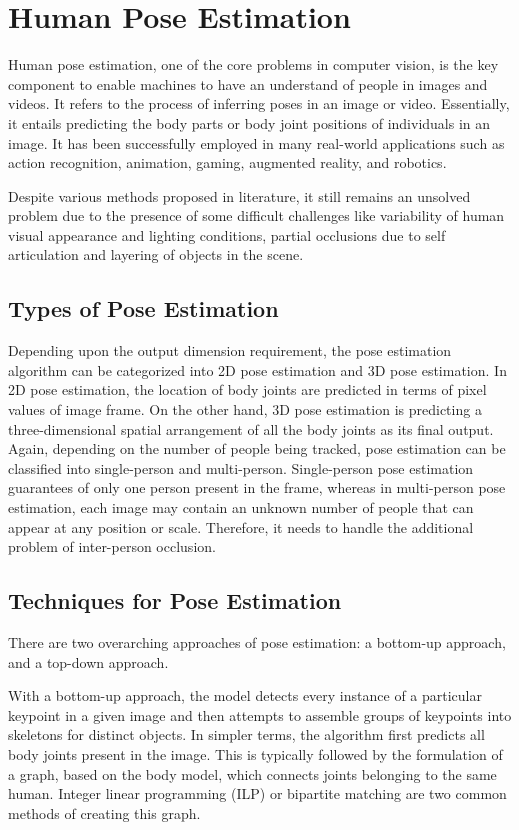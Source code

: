 \section{Human Pose Estimation}
Human pose estimation, one of the core problems in computer vision, is the key component to enable machines to have an understand of people in images and videos. It refers to the process of inferring poses in an image or video. Essentially, it entails predicting the body parts or body joint positions of individuals in an image. It has been successfully employed in many real-world applications such as action recognition, animation, gaming, augmented reality, and robotics. 

Despite various methods proposed in literature, it still remains an unsolved  problem due to the presence of some difficult challenges like variability of human visual appearance and lighting conditions, partial occlusions due to self articulation and layering of objects in the scene. 

\subsection{Types of Pose Estimation} 
Depending upon the output dimension requirement, the pose estimation algorithm can be categorized into 2D pose estimation and 3D pose estimation. In 2D pose estimation, the location of body joints are predicted in terms of pixel values of image frame. On the other hand, 3D pose estimation is predicting a three-dimensional spatial arrangement of all the body joints as its final output. Again, depending on the number of people being tracked, pose estimation can be classified into single-person and multi-person. Single-person pose estimation guarantees of only one person present in the frame, whereas in multi-person pose estimation, each image may contain an unknown number of people that can appear at any position or scale. Therefore, it needs to handle the additional problem of inter-person occlusion. 


\subsection{Techniques for Pose Estimation} 
There are two overarching approaches of pose estimation: a bottom-up approach, and a top-down approach.

With a bottom-up approach, the model detects every instance of a particular keypoint in a given image and then attempts to assemble groups of keypoints into skeletons for distinct objects. In simpler terms, the algorithm first predicts all body joints present in the image. This is typically followed by the formulation of a graph, based on the body model, which connects joints belonging to the same human. Integer linear programming (ILP) or bipartite matching are two common methods of creating this graph.

